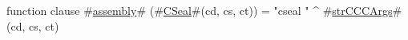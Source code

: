 function clause #\hyperref[sailMIPSzassembly]{assembly}# (#\hyperref[sailMIPSzCSeal]{CSeal}#(cd, cs, ct)) = "cseal " ^ #\hyperref[sailMIPSzstrCCCArgs]{strCCCArgs}#(cd, cs, ct)
